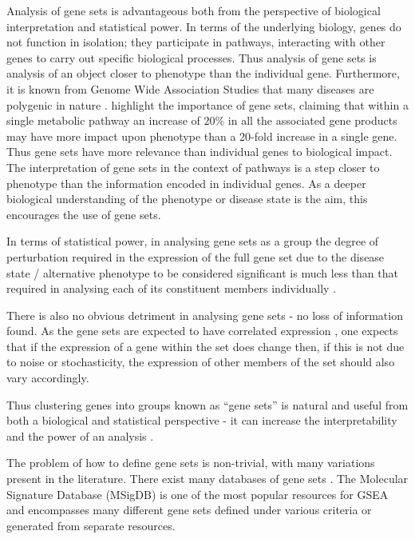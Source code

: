 \documentclass[12pt]{article} %
\begin{document}
	Analysis of gene sets is advantageous both from the perspective of biological interpretation and statistical power. In terms of the underlying biology, genes do not function in isolation; they participate in pathways, interacting with other genes to carry out specific biological processes. Thus analysis of gene sets is analysis of an object closer to phenotype than the individual gene. Furthermore, it is known from Genome Wide Association Studies that many diseases are polygenic in nature \cite{MooneyGenesetanalysis2015}. \citet{SubramanianGenesetenrichment2005a} highlight the importance of gene sets, claiming that within a single metabolic pathway an increase of $20\%$ in all the associated gene products may have more impact upon phenotype than a 20-fold increase in a single gene.  Thus gene sets have more relevance than individual genes to biological impact. The interpretation of gene sets in the context of pathways is a step closer to phenotype than the information encoded in individual genes. As a deeper biological understanding of the phenotype or disease state is the aim, this encourages the use of gene sets.
	
	
	In terms of statistical power, in analysing gene sets as a group the degree of perturbation required in the expression of the full gene set due to the disease state / alternative phenotype to be considered significant is much less than that required in analysing each of its constituent members individually \cite{DudbridgePowerPredictiveAccuracy2013}\cite{WrayResearchReviewPolygenic2014}\cite{MooneyGenesetanalysis2015}.
	
	There is also no obvious detriment in analysing gene sets - no loss of information found. As the gene sets are expected to have correlated expression \cite{WeirauchGeneCoexpressionNetworks2011}, one expects that if the expression of a gene within the set does change then, if this is not due to noise or stochasticity, the expression of other members of the set should also vary accordingly.
	
	Thus clustering genes into groups known as ``gene sets'' is natural and useful from both a biological and statistical perspective - it can increase the interpretability and the power of an analysis \cite{NicaExpressionquantitativetrait2013}\cite{VosaUnravelingpolygenicarchitecture2018}.
	
	
	The problem of how to define gene sets is non-trivial, with many variations present in the literature. There exist many databases of gene sets \cite{AshburnerGeneOntologytool2000a}\cite{KanehisaNewapproachunderstanding2019}\cite{SzklarczykSTRINGv11protein2019}. The Molecular Signature Database \cite{SubramanianGenesetenrichment2005a} (MSigDB) is one of the most popular resources for GSEA and encompasses many different gene sets defined under various criteria or generated from separate resources. 
	
\end{document}
